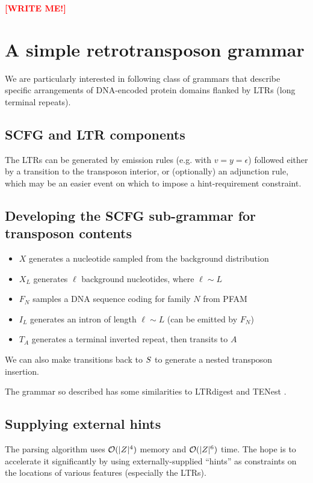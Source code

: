 \documentclass[10pt]{article}
\newcommand{\seclabel}[1]{\label{sec:#1}}
\newcommand\redpen[1]{{\bf \textcolor{red}{#1}} \textcolor{black}{}}
\newcommand\writeme{\redpen{\bf [WRITE ME!]}}
\begin{document}
\writeme

\section{A simple retrotransposon grammar}
\seclabel{RetroGrammar}

We are particularly interested in following class of grammars that describe specific arrangements of DNA-encoded protein domains flanked by LTRs (long terminal repeats).

\subsection{SCFG and LTR components}

The LTRs can be generated by emission rules (e.g. with $v=y=\epsilon$) followed either by a transition to the transposon interior,
or (optionally) an adjunction rule, which may be an easier event on which to impose a hint-requirement constraint.

\subsection{Developing the SCFG sub-grammar for transposon contents}

\begin{itemize}
\item $X$ generates a nucleotide sampled from the background distribution
\item $X_L$ generates $\ell$ background nucleotides, where $\ell \sim L$
\item $F_N$ samples a DNA sequence coding for family $N$ from PFAM \cite{Pfam2008}
\item $I_L$ generates an intron of length $\ell \sim L$ (can be emitted by $F_N$)
\item $T_A$ generates a terminal inverted repeat, then transits to $A$
\end{itemize}
We can also make transitions back to $S$ to generate a nested transposon insertion.

The grammar so described has some similarities to LTRdigest \cite{pmid19786494} and TENest \cite{KronmillerWise2008}.


\subsection{Supplying external hints}

The parsing algorithm uses ${\cal O}(|Z|^4)$ memory and ${\cal O}(|Z|^6)$ time.
The hope is to accelerate it significantly by using externally-supplied ``hints''
as constraints on the locations of various features (especially the LTRs).
\end{document}
